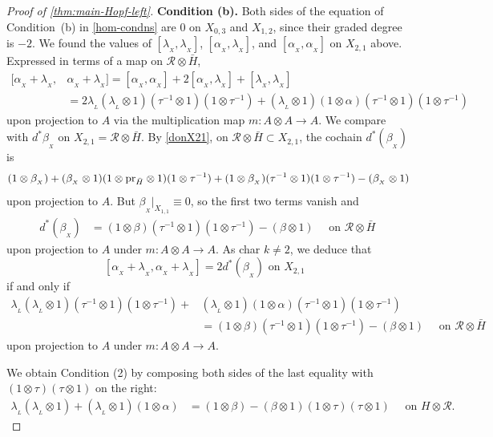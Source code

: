 \documentclass[11pt]{amsart}
\numberwithin{equation}{section}
\newcommand{\X}{_X}
\newcommand{\alphax}{\alpha_{\X}}
\newcommand{\betax}{\beta_{\X}}
\newcommand{\lambdax}{\lambda_{\X}}
\newcommand{\pr}{ {\rm{pr}} }%
\newcommand{\R}{\mathcal{R}}
\newcommand{\itau}{{\tau^{-1}}}%
\renewcommand{\_}[1]{\mbox{$_{\left( #1 \right)}$}}
\newcommand{\ot}{\otimes}
\begin{document}
{\begin{proof}[Proof of \cref{thm:main-Hopf-left}]
 
{\bf Condition (b).}
Both sides of the equation of Condition~(b) in \cref{hom-condns}
are $0$ on $X_{0,3}$ and $X_{1,2}$, since their graded degree is $-2$. 
We found the values of $[\lambdax,\lambdax]$, $[\alphax,\lambdax]$, 
and $[\alphax,\alphax]$ on $X_{2,1}$ above.  Expressed
in terms of a map on $\R\ot \bar H$,
$$
\begin{aligned}
  [\alphax + \lambdax, & \alphax +\lambdax]
  =[\alphax,\alphax]+2[\alphax, \lambdax] + [\lambdax, \lambdax]
\\&= 2 \lambda_{_L} (\lambda_{_L}\ot 1) (\itau\ot 1)(1\ot\itau) 
+  (\lambda_{_L} \ot 1) (1\ot \alpha)(\itau\ot 1)(1\ot \itau ) 
\, 
\end{aligned}
$$
upon projection to $A$ via the multiplication map $m:A\ot A\rightarrow 
A$. 
We compare with $d^*\betax$ on $X_{2,1}=\R\ot \bar H$.
By \cref{donX21}, on $\R\ot \bar H\subset X_{2,1}$,
the cochain  $d^*(\betax)$ is
 $$
\begin{aligned}
  (1\ot \betax)%
  +(\betax\ot 1) (1\ot \pr_{\bar H}\ot 1)
  (1\ot \itau)
 +(1\ot \betax)(\itau\ot 1)(1\ot \itau) - (\betax\ot 1)
\end{aligned}
$$
upon projection to $A$.
But $\betax|_{X_{1,1}}\equiv 0$, so
the first two terms vanish and
 $$ 
\begin{aligned}
   d^*(\betax) &=
   (1\ot \beta)(\itau\ot 1)(1\ot \itau) - (\beta\ot 1)
   \quad\text{ on } \R\ot \bar H\, 
\end{aligned}
$$
upon projection to $A$ under $m:A\ot A\rightarrow A$.
As char $k \neq 2$, we deduce that
$$[\alphax+\lambdax,\alphax+\lambdax] = 2d^*(\betax)
\text{ on $X_{2,1}$ }
$$
if and only if 
$$
\begin{aligned}
  \lambda_{_L} (\lambda_{_L}\ot 1) (\itau\ot 1)(1\ot\itau) 
+  & (\lambda_{_L} \ot 1) (1\ot \alpha)(\itau\ot 1)(1\ot \itau )
\\
&=
(1\ot \beta)(\itau\ot 1)(1\ot \itau) - (\beta\ot 1)
\quad\text{ on $\R\ot \bar H$}
\, 
\end{aligned}
$$
upon projection to $A$ under $m:A\ot A\rightarrow A$.

We obtain Condition (2) by composing both sides
of the last equality
with $(1 \ot \tau)(\tau\ot 1)$ on the right:
$$
\begin{aligned}
\lambda_{_L} (\lambda_{_L}\ot 1) 
+  (\lambda_{_L} \ot 1) (1\ot \alpha)
&=
(1\ot \beta) - (\beta\ot 1) (1 \ot \tau)(\tau\ot 1)
\quad\text{ on $H\ot \R$.}
\end{aligned}
$$



\end{proof}}
\end{document}
